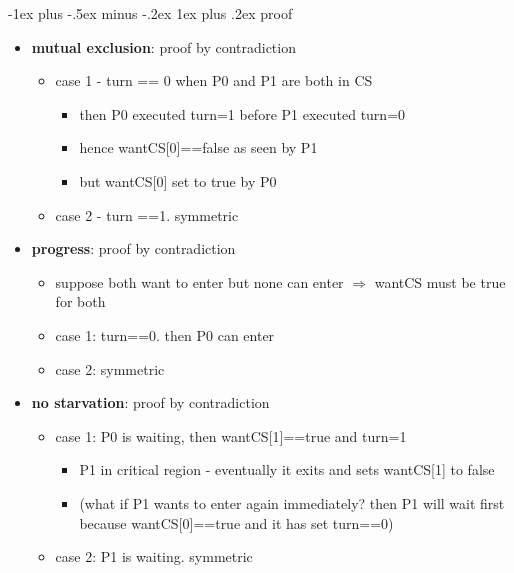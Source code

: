 \documentclass[10pt, landscape]{article}
\makeatletter
\renewcommand{\subsubsection}{\@startsection{subsubsection}{3}{0mm}%
  {-1ex plus -.5ex minus -.2ex}%
  {1ex plus .2ex}%
{\normalfont\small\bfseries}}%
\makeatother
\begin{document}
\begin{multicols*}{3}
  \subsubsection{proof}

  \begin{itemize}
    \item \textbf{mutual exclusion}: proof by contradiction
      \begin{itemize}
        \item case 1 - turn == 0 when P0 and P1 are both in CS
          \begin{itemize}
            \item then P0 executed turn=1 before P1 executed turn=0
            \item hence wantCS[0]==false as seen by P1
            \item but wantCS[0] set to true by P0
          \end{itemize}
        \item case 2 - turn ==1. symmetric
      \end{itemize}
    \item \textbf{progress}: proof by contradiction
      \begin{itemize}
        \item suppose both want to enter but none can enter $\Rightarrow$ wantCS must be true for both
        \item case 1: turn==0. then P0 can enter
        \item case 2: symmetric
      \end{itemize}
    \item \textbf{no starvation}: proof by contradiction
      \begin{itemize}
        \item case 1: P0 is waiting, then wantCS[1]==true and turn=1
          \begin{itemize}
            \item P1 in critical region - eventually it exits and sets wantCS[1] to false
            \item (what if P1 wants to enter again immediately? then P1 will wait first because wantCS[0]==true and it has set turn==0)
          \end{itemize}
        \item case 2: P1 is waiting. symmetric
      \end{itemize}
  \end{itemize}

  \vfill\null
  \columnbreak


\end{multicols*}
\end{document}
